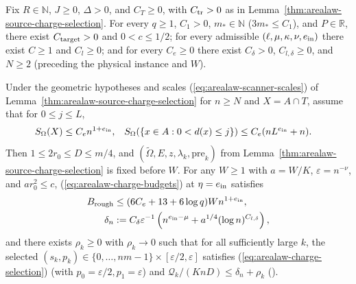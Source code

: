 \begin{lemma}
    \label{thm:arealaw-source-selected-density}
    \leanok
    Fix $R\in\mathbb N$, $J\geq0$, $\Delta>0$, and $C_T\geq0$, with $C_{\rm tr}>0$ as in Lemma~\ref{thm:arealaw-source-charge-selection}. For every $q\geq1$, $C_1>0$, $m_*\in\mathbb N$ ($3m_*\leq C_1$), and $P\in\mathbb R$, there exist $C_{\rm target}>0$ and $0<c\leq1/2$; for every admissible $(\ell,\mu,\kappa,\nu,e_{\rm in})$ there exist $C\geq1$ and $C_l\geq0$; and for every $C_e\geq0$ there exist $C_\delta>0$, $C_{l,\delta}\geq0$, and $N\geq2$ (preceding the physical instance and $W$).

    Under the geometric hypotheses and scales (\ref{eq:arealaw-scanner-scales}) of Lemma~\ref{thm:arealaw-source-charge-selection} for $n\ge N$ and $X=A\cap T$, assume that for $0\leq j\leq L$,
    \begin{align}
        S_\Omega(X) & \leq C_en^{1+e_{\rm in}},          &
        S_\Omega(\{x\in A:0<d(x)\leq j\})
                    & \leq C_e(nL^{e_{\rm in}}+n).\notag
    \end{align}
    Then $1\le 2r_0\le D\le m/4$, and $(\widetilde\Omega,E,z,\lambda_k,\mathrm{pre}_k)$ from Lemma~\ref{thm:arealaw-source-charge-selection} is fixed before $W$.
    For any $W\geq1$ with $a=W/K$, $\varepsilon=n^{-\nu}$, and $ar_0^2\leq c$, (\ref{eq:arealaw-charge-budgets}) at $\eta=e_{\rm in}$ satisfies
    \begin{align}
        B_{\rm rough}
         & \leq (6C_e+13+6\log q)Wn^{1+e_{\rm in}},\notag \\
        \delta_n
         & :=C_\delta\varepsilon^{-1}
        \left(n^{e_{\rm in}-\mu}+a^{1/4}(\log n)^{C_{l,\delta}}\right),
        \label{eq:arealaw-source-density}
    \end{align}
    and there exists $\rho_k\ge0$ with $\rho_k\to0$ such that for all sufficiently large $k$, the selected $(s_k,p_k)\in\{0,\ldots,nm-1\}\times[\varepsilon/2,\varepsilon]$ satisfies (\ref{eq:arealaw-charge-selection}) (with $p_0=\varepsilon/2,p_1=\varepsilon$) and
    $\mathcal Q_k/(KnD)\leq\delta_n+\rho_k$ (\cite[Proposition~9.2, lines~475--490]{OpenAI2026AreaLaw}).
\end{lemma}
